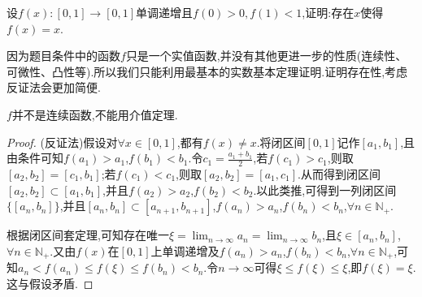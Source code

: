 \documentclass[../../main.tex]{subfiles}
\begin{document}
\begin{example}
设\(f(x):[0,1]\to[0,1]\)单调递增且\(f(0)>0,f(1)<1\),证明:存在\(x\)使得\(f(x)=x\).
\end{example}
\begin{note}
因为题目条件中的函数$f$只是一个实值函数,并没有其他更进一步的性质(连续性、可微性、凸性等).所以我们只能利用最基本的实数基本定理证明.证明存在性,考虑反证法会更加简便.
\end{note}
\begin{remark}
$f$并不是连续函数,不能用介值定理.
\end{remark}
\begin{proof}
(反证法)假设对$\forall x\in[0,1]$,都有$f(x)\ne x$.将闭区间\([0,1]\)记作\([a_1,b_1]\),且由条件可知\(f(a_1)>a_1\),\(f(b_1)<b_1\).令\(c_1=\frac{a_1 + b_1}{2}\),若\(f(c_1)>c_1\),则取\([a_2,b_2]=[c_1,b_1]\);若\(f(c_1)<c_1\),则取\([a_2,b_2]=[a_1,c_1]\).从而得到闭区间\([a_2,b_2]\subset [a_1,b_1]\),并且\(f(a_2)>a_2\),\(f(b_2)<b_2\).以此类推,可得到一列闭区间\(\{[a_n,b_n]\}\),并且\([a_n,b_n]\subset [a_{n + 1},b_{n + 1}]\),\(f(a_n)>a_n\),\(f(b_n)<b_n\),\(\forall n\in\mathbb{N}_+\).

根据闭区间套定理,可知存在唯一\(\xi=\lim_{n\rightarrow\infty}a_n=\lim_{n\rightarrow\infty}b_n\),且\(\xi\in [a_n,b_n]\),\(\forall n\in\mathbb{N}_+\).又由\(f(x)\)在\([0,1]\)上单调递增及\(f(a_n)>a_n\),\(f(b_n)<b_n\),\(\forall n\in\mathbb{N}_+\),可知\(a_n<f(a_n)\leqslant f(\xi)\leqslant f(b_n)<b_n\).令\(n\rightarrow\infty\)可得\(\xi\leqslant f(\xi)\leqslant\xi\),即\(f(\xi)=\xi\).这与假设矛盾.
\end{proof}
\end{document}
